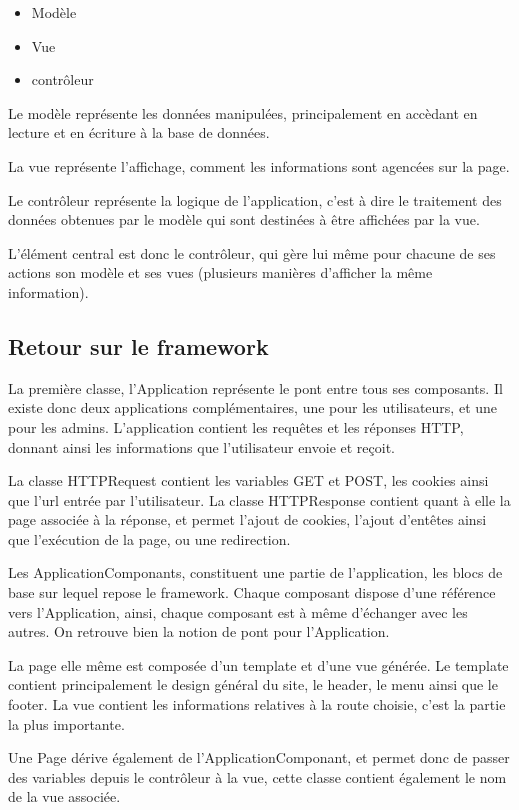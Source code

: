     \begin{itemize}
    \item Modèle
    \item Vue
    \item contrôleur
    \end{itemize}

Le modèle représente les données manipulées, principalement en accèdant en lecture et en écriture à la base de données.

La vue représente l'affichage, comment les informations sont agencées sur la page.

Le contrôleur représente la logique de l'application, c'est à dire le traitement des données obtenues par le modèle
qui sont destinées à être affichées par la vue.

L'élément central est donc le contrôleur, qui gère lui même pour chacune de ses actions son modèle et ses vues (plusieurs
manières d'afficher la même information).

        \subsection{Retour sur le framework}

La première classe, l'Application représente le pont entre tous ses composants. Il existe donc deux applications complémentaires, une pour les utilisateurs, et une pour les admins.
L'application contient les requêtes et les réponses HTTP, donnant ainsi les informations que l'utilisateur envoie et reçoit.

La classe HTTPRequest contient les variables GET et POST, les cookies ainsi que l'url entrée par l'utilisateur.
La classe HTTPResponse contient quant à elle la page associée à la réponse, et permet l'ajout de cookies, l'ajout d'entêtes
ainsi que l'exécution de la page, ou une redirection.

Les ApplicationComponants, constituent une partie de l'application, les blocs de base sur lequel repose le framework.
Chaque composant dispose d'une référence vers l'Application, ainsi, chaque composant est à même d'échanger avec les autres.
On retrouve bien la notion de pont pour l'Application.

La page elle même est composée d'un template et d'une vue générée.
Le template contient principalement le design général du site, le header, le menu ainsi que le footer.
La vue contient les informations relatives à la route choisie, c'est la partie la plus importante.

Une Page dérive également de l'ApplicationComponant, et permet donc de passer des variables depuis le contrôleur à la vue,
cette classe contient également le nom de la vue associée.


